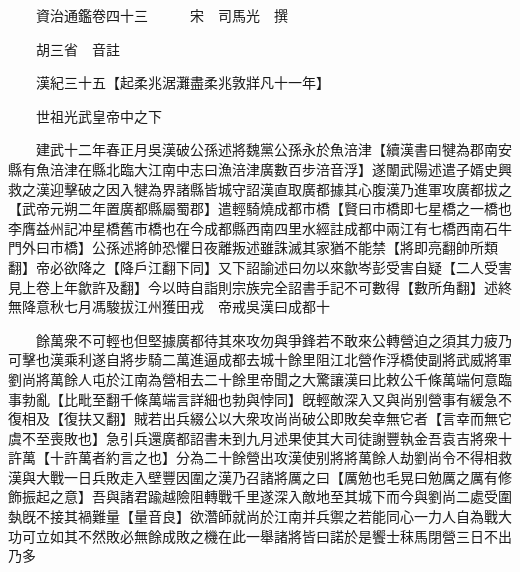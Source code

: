 










 


 
 


 

  
  
  
  
  





  
  
  
  
  
 
  

  

  
  
  



  

 
 

  
   




  

  
  


  　　資治通鑑卷四十三　　　宋　司馬光　撰

　　胡三省　音註

　　漢紀三十五【起柔兆涺灘盡柔兆敦牂凡十一年】

　　世祖光武皇帝中之下

　　建武十二年春正月吳漢破公孫述將魏黨公孫永於魚涪津【續漢書曰犍為郡南安縣有魚涪津在縣北臨大江南中志曰漁涪津廣數百步涪音浮】遂闈武陽述遣子婿史興救之漢迎擊破之因入犍為界諸縣皆城守詔漢直取廣都據其心腹漢乃進軍攻廣都拔之【武帝元朔二年置廣都縣屬蜀郡】遣輕騎燒成都市橋【賢曰市橋即七星橋之一橋也李膺益州記冲星橋舊市橋也在今成都縣西南四里水經註成都中兩江有七橋西南石牛門外曰市橋】公孫述將帥恐懼日夜離叛述雖誅滅其家猶不能禁【將即亮翻帥所類翻】帝必欲降之【降戶江翻下同】又下詔諭述曰勿以來歙岑彭受害自疑【二人受害見上卷上年歙許及翻】今以時自詣則宗族完全詔書手記不可數得【數所角翻】述終無降意秋七月馮駿拔江州獲田戎　帝戒吳漢曰成都十

　　餘萬衆不可輕也但堅據廣都待其來攻勿與爭鋒若不敢來公轉營迫之須其力疲乃可擊也漢乘利遂自將步騎二萬進逼成都去城十餘里阻江北營作浮橋使副將武威將軍劉尚將萬餘人屯於江南為營相去二十餘里帝聞之大驚讓漢曰比敕公千條萬端何意臨事勃亂【比毗至翻千條萬端言詳細也勃與悖同】旣輕敵深入又與尚别營事有緩急不復相及【復扶又翻】賊若出兵綴公以大衆攻尚尚破公即敗矣幸無它者【言幸而無它虞不至喪敗也】急引兵還廣都詔書未到九月述果使其大司徒謝豐執金吾袁吉將衆十許萬【十許萬者約言之也】分為二十餘營出攻漢使别將將萬餘人劫劉尚令不得相救漢與大戰一日兵敗走入壁豐因圍之漢乃召諸將厲之曰【厲勉也毛晃曰勉厲之厲有修飾振起之意】吾與諸君踰越險阻轉戰千里遂深入敵地至其城下而今與劉尚二處受圍埶旣不接其禍難量【量音良】欲濳師就尚於江南并兵禦之若能同心一力人自為戰大功可立如其不然敗必無餘成敗之機在此一舉諸將皆曰諾於是饗士秣馬閉營三日不出乃多


